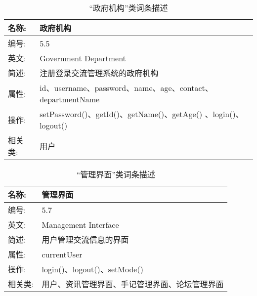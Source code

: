 \begin{table}[H]  
\caption{“政府机构”类词条描述}  
\begin{center}  
    \begin{tabular}{l p{11cm}} 
        \hline
        \quad 名称:  & 政府机构 \\
        \hline
        \quad 编号:  & 5.5 \\
        \hline
        \quad 英文:  &  Government Department \\
        \hline
        \quad 简述:  & 注册登录交流管理系统的政府机构 \\
        \hline
        \quad 属性:  & id、username、password、name、age、contact、departmentName \\
        \hline
        \quad 操作:  & setPassword()、getId()、getName()、getAge() 、login()、logout() \\
        \hline
        \quad 相关类:  & 用户 \\
        \hline
    \end{tabular}
\end{center}
\end{table}

\begin{table}[H]  
\caption{“管理界面”类词条描述}  
\begin{center}  
    \begin{tabular}{l p{11cm}} 
        \hline
        \quad 名称:  & 管理界面 \\
        \hline
        \quad 编号:  & 5.7 \\
        \hline
        \quad 英文:  &  Management Interface \\
        \hline
        \quad 简述:  & 用户管理交流信息的界面 \\
        \hline
        \quad 属性:  & currentUser \\
        \hline
        \quad 操作:  & login()、logout()、setMode() \\
        \hline
        \quad 相关类: & 用户、资讯管理界面、手记管理界面、论坛管理界面\\
        \hline
    \end{tabular}
\end{center}
\end{table}


